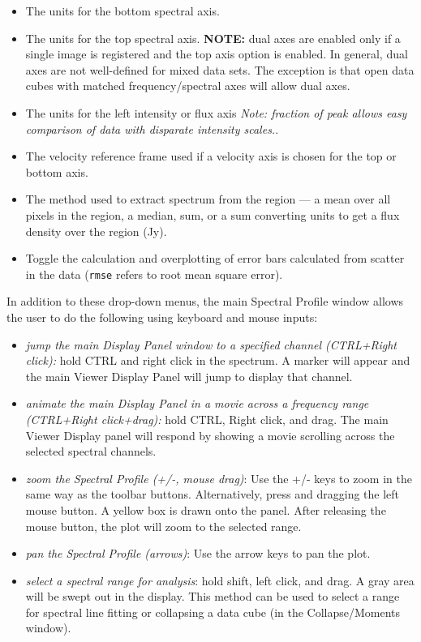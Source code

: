 \begin{itemize}
\item The units for the bottom spectral axis.
\item The units for the top spectral axis. {\bf NOTE:} dual axes are enabled only if a single image 
is registered and the top axis option is enabled. In general, dual axes are not well-defined for mixed data sets. The
exception is that open data cubes with matched frequency/spectral axes will allow dual axes.
\item The units for the left intensity or flux axis {\em Note: fraction of peak allows easy comparison of data
with disparate intensity scales.}.
\item The velocity reference frame used if a velocity axis is chosen for the top or bottom axis.
\item The method used to extract spectrum from the region --- a mean over all pixels in the region, a median,
sum, or a sum converting units to get a flux density over the region (Jy).
\item Toggle the calculation and overplotting of error bars calculated from scatter in the data ({\tt rmse} refers
to root mean square error).
\end{itemize}

In addition to these drop-down menus, the main Spectral Profile window allows the user to do the following using keyboard and mouse inputs: %

\begin{itemize}
\item {\em jump the main Display Panel window to a specified channel (CTRL+Right click):} hold CTRL and right click in the spectrum. A marker will appear and the
main Viewer Display Panel will jump to display that channel.
\item {\em animate the main Display Panel in a movie across a frequency range (CTRL+Right click+drag):} hold CTRL, Right click, and drag. The main Viewer Display
panel will respond by showing a movie scrolling across the selected spectral channels.
\item {\em zoom the Spectral Profile (+/-, mouse drag)}: Use the +/- keys to zoom in the same
way as the toolbar buttons. Alternatively, press and dragging the left mouse button. A yellow box is drawn onto the panel. After releasing the mouse button,
the plot will zoom to the selected range.
\item {\em pan the Spectral Profile (arrows)}: Use the arrow keys to pan the plot.
\item {\em select a spectral range for analysis}: hold shift, left click, and drag. A gray area will be swept out in the display. This method can be used to select a range
for spectral line fitting or collapsing a data cube (in the Collapse/Moments window).
\end{itemize}

